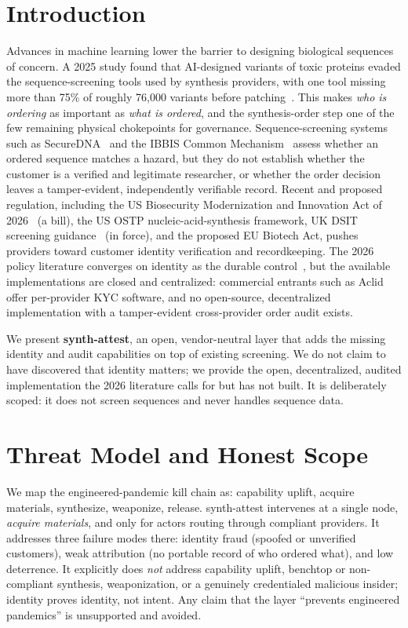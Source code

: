 \documentclass[conference]{IEEEtran}
\begin{document}
\section{Introduction}
Advances in machine learning lower the barrier to designing biological sequences of concern. A
2025 study found that AI-designed variants of toxic proteins evaded the sequence-screening tools
used by synthesis providers, with one tool missing more than 75\% of roughly 76{,}000
variants before patching~\cite{paraphrase}. This makes \textit{who is ordering} as important as
\textit{what is ordered}, and the synthesis-order step one of the few remaining physical
chokepoints for governance. Sequence-screening systems such as SecureDNA~\cite{securedna} and
the IBBIS Common Mechanism~\cite{ibbis} assess whether an ordered sequence matches a hazard, but
they do not establish whether the customer is a verified and legitimate researcher, or whether
the order decision leaves a tamper-evident, independently verifiable record. Recent and proposed
regulation, including the US Biosecurity Modernization and Innovation Act of 2026~\cite{s3741}
(a bill), the US OSTP nucleic-acid-synthesis framework, UK DSIT screening guidance~\cite{dsit}
(in force), and the proposed EU Biotech Act, pushes providers toward customer identity
verification and recordkeeping. The 2026 policy literature converges on identity as the durable
control~\cite{kys}, but the available implementations are closed and centralized: commercial
entrants such as Aclid offer per-provider KYC software, and no open-source, decentralized
implementation with a tamper-evident cross-provider order audit exists.

We present \textbf{synth-attest}, an open, vendor-neutral layer that adds the missing identity
and audit capabilities on top of existing screening. We do not claim to have discovered that
identity matters; we provide the open, decentralized, audited implementation the 2026 literature
calls for but has not built. It is deliberately scoped: it does not screen sequences and never
handles sequence data.

\section{Threat Model and Honest Scope}
We map the engineered-pandemic kill chain as: capability uplift, acquire materials, synthesize,
weaponize, release. synth-attest intervenes at a single node, \textit{acquire materials}, and
only for actors routing through compliant providers. It addresses three failure modes there:
identity fraud (spoofed or unverified customers), weak attribution (no portable record of who
ordered what), and low deterrence. It explicitly does \textit{not} address capability uplift,
benchtop or non-compliant synthesis, weaponization, or a genuinely credentialed malicious
insider; identity proves identity, not intent. Any claim that the layer ``prevents engineered
pandemics'' is unsupported and avoided.
\end{document}
